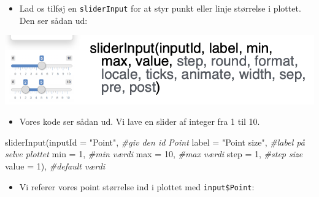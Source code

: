 \documentclass[
]{book}
\newenvironment{Shaded}{\begin{snugshade}}{\end{snugshade}}
\newcommand{\AttributeTok}[1]{\textcolor[rgb]{0.77,0.63,0.00}{#1}}
\newcommand{\CommentTok}[1]{\textcolor[rgb]{0.56,0.35,0.01}{\textit{#1}}}
\newcommand{\DecValTok}[1]{\textcolor[rgb]{0.00,0.00,0.81}{#1}}
\newcommand{\FunctionTok}[1]{\textcolor[rgb]{0.00,0.00,0.00}{#1}}
\newcommand{\NormalTok}[1]{#1}
\newcommand{\SpecialCharTok}[1]{\textcolor[rgb]{0.00,0.00,0.00}{#1}}
\newcommand{\StringTok}[1]{\textcolor[rgb]{0.31,0.60,0.02}{#1}}
\providecommand{\tightlist}{%
  \setlength{\itemsep}{0pt}\setlength{\parskip}{0pt}}
\begin{document}
\begin{itemize}
\tightlist
\item
  Lad os tilføj en \texttt{sliderInput} for at styr punkt eller linje størrelse i plottet. Den ser sådan ud:
\end{itemize}

\includegraphics[width=0.4\linewidth]{plots/sliderInput}

\begin{itemize}
\tightlist
\item
  Vores kode ser sådan ud. Vi lave en slider af integer fra 1 til 10.
\end{itemize}

\begin{Shaded}
\begin{Highlighting}[]
    \FunctionTok{sliderInput}\NormalTok{(}\AttributeTok{inputId =} \StringTok{"Point"}\NormalTok{,    }\CommentTok{\#giv den id Point}
                \AttributeTok{label =} \StringTok{"Point size"}\NormalTok{, }\CommentTok{\#label på selve plottet}
                \AttributeTok{min =} \DecValTok{1}\NormalTok{,              }\CommentTok{\#min værdi}
                \AttributeTok{max =} \DecValTok{10}\NormalTok{,             }\CommentTok{\#max værdi}
                \AttributeTok{step =} \DecValTok{1}\NormalTok{,             }\CommentTok{\#step size}
                \AttributeTok{value =} \DecValTok{1}\NormalTok{),           }\CommentTok{\#default værdi}
\end{Highlighting}
\end{Shaded}

\begin{itemize}
\tightlist
\item
  Vi referer vores point størrelse ind i plottet med \texttt{input\$Point}:
\end{itemize}

\begin{Shaded}
\end{Shaded}
\end{document}
